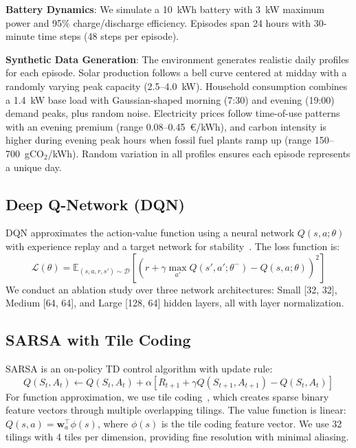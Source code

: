 \documentclass[runningheads]{llncs}
\begin{document}
\textbf{Battery Dynamics}: We simulate a 10~kWh battery with 3~kW maximum power and 95\% charge/discharge efficiency. Episodes span 24 hours with 30-minute time steps (48 steps per episode).

\textbf{Synthetic Data Generation}: The environment generates realistic daily profiles for each episode. Solar production follows a bell curve centered at midday with a randomly varying peak capacity (2.5--4.0~kW). Household consumption combines a 1.4~kW base load with Gaussian-shaped morning (7:30) and evening (19:00) demand peaks, plus random noise. Electricity prices follow time-of-use patterns with an evening premium (range 0.08--0.45~\euro{}/kWh), and carbon intensity is higher during evening peak hours when fossil fuel plants ramp up (range 150--700~gCO$_2$/kWh). Random variation in all profiles ensures each episode represents a unique day.

\subsection{Deep Q-Network (DQN)}

DQN approximates the action-value function using a neural network $Q(s, a; \theta)$ with experience replay and a target network for stability~\cite{mnih2015dqn}. The loss function is:
\begin{equation}
    \mathcal{L}(\theta) = \mathbb{E}_{(s,a,r,s') \sim \mathcal{D}} \left[ \left( r + \gamma \max_{a'} Q(s', a'; \theta^-) - Q(s, a; \theta) \right)^2 \right]
\end{equation}
We conduct an ablation study over three network architectures: Small [32, 32], Medium [64, 64], and Large [128, 64] hidden layers, all with layer normalization.

\subsection{SARSA with Tile Coding}

SARSA is an on-policy TD control algorithm with update rule:
\begin{equation}
    Q(S_t, A_t) \leftarrow Q(S_t, A_t) + \alpha \left[ R_{t+1} + \gamma Q(S_{t+1}, A_{t+1}) - Q(S_t, A_t) \right]
\end{equation}
For function approximation, we use tile coding~\cite{sutton2018rl}, which creates sparse binary feature vectors through multiple overlapping tilings. The value function is linear: $Q(s, a) = \mathbf{w}_a^\top \phi(s)$, where $\phi(s)$ is the tile coding feature vector. We use 32 tilings with 4 tiles per dimension, providing fine resolution with minimal aliasing.
\end{document}

